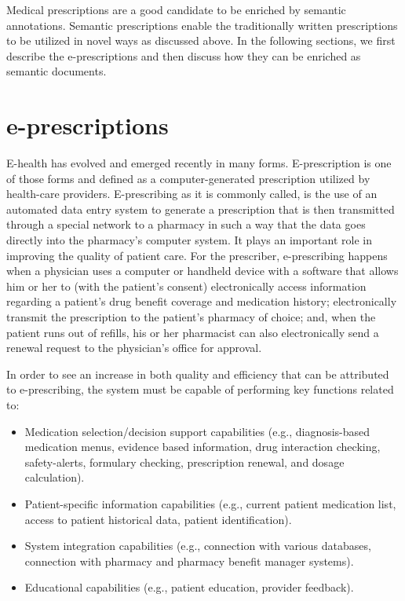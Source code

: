 \documentclass[10pt, conference, compsocconf]{IEEEtran}
\begin{document}
Medical prescriptions are a good candidate to be enriched by semantic annotations.
Semantic prescriptions enable the traditionally written prescriptions to be utilized in novel ways as discussed above.
In the following sections, we first describe the e-prescriptions and then discuss how they can be enriched as semantic documents.

\section{e-prescriptions}
\label{sec:epresc}
E-health has evolved and emerged recently in many forms.
E-prescription is one of those forms and defined as a computer-generated prescription utilized by health-care providers.
E-prescribing as it is commonly called, is the use of an automated data entry system to generate a prescription that is then transmitted through a special network to a pharmacy in such a way that the data goes directly into the pharmacy’s computer system.
It plays an important role in improving the quality of patient care.
For the prescriber, e-prescribing happens when a physician uses a computer or handheld device with a software that allows him or her to (with the patient’s consent) electronically access information regarding a patient’s drug benefit coverage and medication history; electronically transmit the prescription to the patient’s pharmacy of choice; and, when the patient runs out of refills, his or her pharmacist can also electronically send a renewal request to the physician’s office for approval.

In order to see an increase in both quality and efficiency that can be attributed to e-prescribing, the system must be capable of performing key functions related to:
\begin{itemize}
  \item Medication selection/decision support capabilities (e.g., diagnosis-based medication menus, evidence based information, drug interaction checking, safety-alerts, formulary checking, prescription renewal, and dosage calculation).
  \item Patient-specific information capabilities (e.g., current patient medication list, access to patient historical data, patient identification).
  \item System integration capabilities (e.g., connection with various databases, connection with pharmacy and pharmacy benefit manager systems).
  \item Educational capabilities (e.g., patient education, provider feedback).
\end{itemize}
\end{document}

